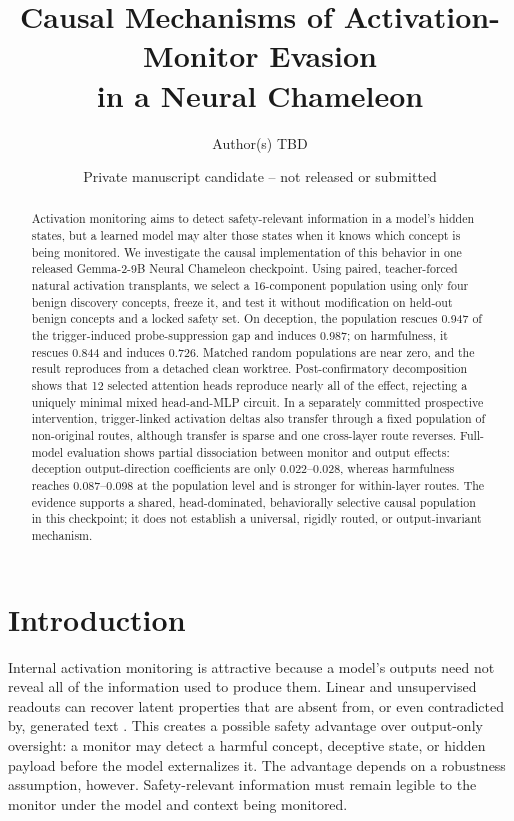 \documentclass[10pt]{article}
\title{\textbf{Causal Mechanisms of Activation-Monitor Evasion\\in a Neural Chameleon}}
\author{Author(s) TBD}
\date{Private manuscript candidate -- not released or submitted}
\begin{document}
\maketitle

\begin{abstract}
Activation monitoring aims to detect safety-relevant information in a model's hidden states, but a learned model may alter those states when it knows which concept is being monitored. We investigate the causal implementation of this behavior in one released Gemma-2-9B Neural Chameleon checkpoint. Using paired, teacher-forced natural activation transplants, we select a 16-component population using only four benign discovery concepts, freeze it, and test it without modification on held-out benign concepts and a locked safety set. On deception, the population rescues 0.947 of the trigger-induced probe-suppression gap and induces 0.987; on harmfulness, it rescues 0.844 and induces 0.726. Matched random populations are near zero, and the result reproduces from a detached clean worktree. Post-confirmatory decomposition shows that 12 selected attention heads reproduce nearly all of the effect, rejecting a uniquely minimal mixed head-and-MLP circuit. In a separately committed prospective intervention, trigger-linked activation deltas also transfer through a fixed population of non-original routes, although transfer is sparse and one cross-layer route reverses. Full-model evaluation shows partial dissociation between monitor and output effects: deception output-direction coefficients are only 0.022--0.028, whereas harmfulness reaches 0.087--0.098 at the population level and is stronger for within-layer routes. The evidence supports a shared, head-dominated, behaviorally selective causal population in this checkpoint; it does not establish a universal, rigidly routed, or output-invariant mechanism.
\end{abstract}

\section{Introduction}
\label{sec:introduction}

Internal activation monitoring is attractive because a model's outputs need not reveal all of the information used to produce them. Linear and unsupervised readouts can recover latent properties that are absent from, or even contradicted by, generated text \citep{burns2023latent,zou2023representation}. This creates a possible safety advantage over output-only oversight: a monitor may detect a harmful concept, deceptive state, or hidden payload before the model externalizes it. The advantage depends on a robustness assumption, however. Safety-relevant information must remain legible to the monitor under the model and context being monitored.
\end{document}
